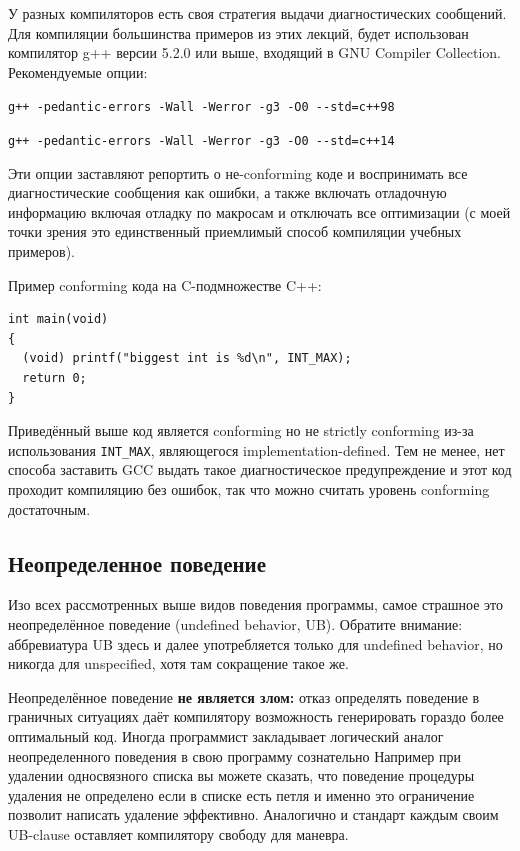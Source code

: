 \documentclass[a4paper,12pt,oneside]{article}
\begin{document}
У разных компиляторов есть своя стратегия выдачи диагностических сообщений. Для компиляции большинства примеров из этих лекций, будет использован компилятор g++ версии 5.2.0 или выше, входящий в GNU Compiler Collection. Рекомендуемые опции: 

\lstinline!g++ -pedantic-errors -Wall -Werror -g3 -O0 --std=c++98!

\lstinline!g++ -pedantic-errors -Wall -Werror -g3 -O0 --std=c++14!

Эти опции заставляют репортить о не-conforming коде и воспринимать все диагностические сообщения как ошибки, а также включать отладочную информацию включая отладку по макросам и отключать все оптимизации (с моей точки зрения это единственный приемлимый способ компиляции учебных примеров).

Пример conforming кода на C-подмножестве C++:

\begin{lstlisting}
int main(void) 
{ 
  (void) printf("biggest int is %d\n", INT_MAX);
  return 0;
}
\end{lstlisting}

Приведённый выше код является conforming но не strictly conforming из-за использования \lstinline!INT_MAX!, являющегося implementation-defined. Тем не менее, нет способа заставить GCC выдать такое диагностическое предупреждение и этот код проходит компиляцию без ошибок, так что можно считать уровень conforming достаточным.

\pagebreak
\subsection{Неопределенное поведение}\label{UB}

Изо всех рассмотренных выше видов поведения программы, самое страшное это неопределённое поведение (undefined behavior, UB). Обратите внимание: аббревиатура UB здесь и далее употребляется только для undefined behavior, но никогда для unspecified, хотя там сокращение такое же.

Неопределённое поведение \textbf{не является злом:} отказ определять поведение в граничных ситуациях даёт компилятору возможность генерировать гораздо более оптимальный код. Иногда программист закладывает логический аналог неопределенного поведения в свою программу сознательно Например при удалении односвязного списка вы можете сказать, что поведение процедуры удаления не определено если в списке есть петля и именно это ограничение позволит написать удаление эффективно. Аналогично и стандарт каждым своим UB-clause оставляет компилятору свободу для маневра.
\end{document}

